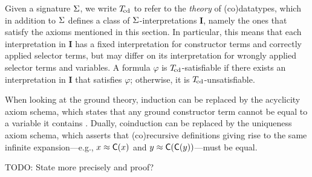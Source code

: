 
Given a signature $\mathrm{\Sigma}$, we write $T_{\!\mathrm{cd}}$ to refer to the \emph{theory} of (co)datatypes,
which in addition to $\mathrm{\Sigma}$ defines a class of $\mathrm{\Sigma}$-interpretations $\mathbf{I}$,
namely the ones that satisfy the axioms mentioned in this section.
In particular, this means that each interpretation in $\mathbf{I}$ has a fixed interpretation
for constructor terms and correctly applied selector terms, but may differ on its interpretation for
wrongly applied selector terms and variables.
A formula $\varphi$ is $T_{\!\mathrm{cd}}$-satisfiable if there exists an interpretation in $\mathbf{I}$ that satisfies $\varphi$;
otherwise, it is $T_{\!\mathrm{cd}}$-unsatisfiable.

When looking at the ground theory, induction can be replaced by the acyclicity
axiom schema, which states that any ground constructor term cannot be equal to
a variable it contains \cite{xxx}. Dually, coinduction can be replaced by the
uniqueness axiom schema, which asserts that (co)recursive definitions giving
rise to the same infinite expansion---e.g., $x \approx \textsf{C}(x)$ and $y \approx
\textsf{C}(\textsf{C}(y))$---must be equal.

\begin{report}
TODO: State more precisely and proof?
\end{report}



